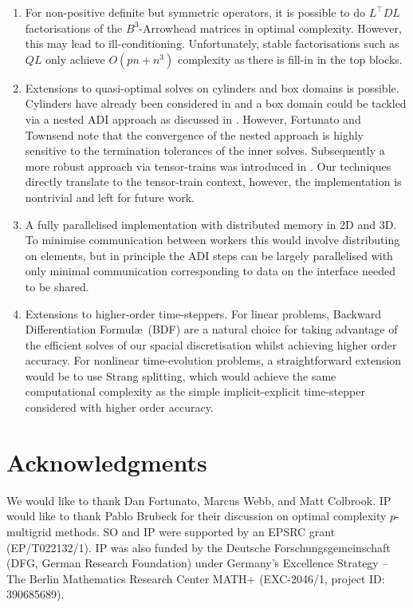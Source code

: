 \documentclass[hidelinks,onefignum,onetabnum]{siamart220329}
\begin{document}
\begin{enumerate}
\item For non-positive definite but symmetric operators, it is possible to do $L^\top DL$ factorisations of the $B^3$-Arrowhead matrices in optimal complexity. However, this may lead to ill-conditioning. Unfortunately, stable factorisations such as $QL$  only achieve $O(p n + n^3)$ complexity as there is fill-in in the top blocks. 
\item  Extensions to quasi-optimal solves on cylinders and box domains is possible. Cylinders have already been considered in \cite{papadopoulos2024} and a box domain could be tackled via a nested ADI approach as discussed in \cite[Sec.~5]{fortunato2020fast}. However, Fortunato and Townsend note that the convergence of the nested approach is highly sensitive to the termination tolerances of the inner solves. Subsequently a more robust approach via tensor-trains was introduced in \cite{shi2021}. Our techniques directly translate to the tensor-train context, however, the implementation is nontrivial and left for future work. 
\item  A fully parallelised implementation with distributed memory in 2D and 3D. To minimise communication between workers this would involve distributing on elements, but in principle the ADI steps can be largely parallelised with only minimal communication corresponding to data on the interface needed to be shared. 
\item  Extensions to higher-order time-steppers.  For linear problems,  Backward Differentiation Formul\ae\ (BDF)  are a natural choice for taking advantage of the efficient solves of our spacial discretisation whilst achieving higher order accuracy. For nonlinear time-evolution problems, a straightforward extension would be to use Strang splitting, which would achieve the same computational complexity as the simple implicit-explicit time-stepper considered  with higher order accuracy.     
\end{enumerate}



\section*{Acknowledgments}
We would like to thank Dan Fortunato, Marcus Webb, and Matt Colbrook. IP would like to thank Pablo Brubeck for their discussion on optimal complexity $p$-multigrid methods. SO and IP were  supported by an EPSRC grant (EP/T022132/1). IP was also funded by the Deutsche Forschungsgemeinschaft (DFG, German Research
Foundation) under Germany's Excellence Strategy -- The Berlin Mathematics
Research Center MATH+ (EXC-2046/1, project ID: 390685689).
\end{document}
